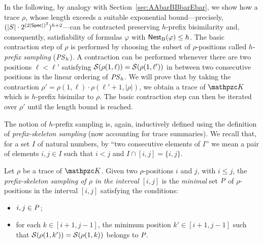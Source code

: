 In the following, by analogy with Section~\ref{sec:AAbarBBbarEbar}, we show how a trace $\rho$, whose length exceeds a suitable exponential bound---precisely, $(|S|\cdot 2^{(2|\textsf{Spec}|)^2})^{h+2}$---can be contracted preserving $h$-prefix bisimilarity and, consequently, satisfiability of formulas $\varphi$ with $\operatorname{\mathsf{Nest}_B}(\varphi) \leq h$. The basic contraction step of $\rho$ is performed by choosing the subset of $\rho$-positions called $h$-\emph{prefix sampling} (${\mathit{PS}}_h$). A contraction can be performed whenever there are two positions $\ell < \ell'$ satisfying $\mathcal{S}(\rho(1,\ell))=\mathcal{S}(\rho(1,\ell'))$ in between two consecutive positions in the linear ordering of ${\mathit{PS}}_h$. We will prove that  by taking the contraction $\rho'=\rho(1,\ell)\cdot \rho(\ell'+1,|\rho|)$, we obtain a trace of $\Ku$ which is $h$-prefix bisimilar to $\rho$. The basic contraction step can then be iterated over $\rho'$ until the length bound is reached.

The notion of $h$-prefix sampling is, again, inductively defined using the definition of \emph{prefix-skeleton sampling} (now  accounting for trace summaries).
%
%
We recall that, for a set $I$ of natural numbers, by ``two consecutive elements of $I$'' we mean a pair of elements $i,j\in I$ such that $i<j$ and $I\cap [i,j]=\{i,j\}$.

\begin{definition}\label{def:skeletonRegex}  Let $\rho$ be a trace of $\Ku$. Given two $\rho$-positions $i$ and $j$, with $i\leq j$, the \emph{prefix-skeleton sampling of $\rho$ in the interval $
[i,j]$} is the \emph{minimal} set $\textit{P}$ of $\rho$-positions in the interval $[i,j]$ satisfying the conditions:
\begin{itemize}
    \item $i,j\in \textit{P}\,$;
    \item  for each $k\in [i+1,j-1]$, the minimum position $k'\in [i+1,j-1]$ such that $\mathcal{S}(\rho(1,k'))=\mathcal{S}(\rho(1,k))$ belongs to $\textit{P}$.
\end{itemize}
\end{definition}

